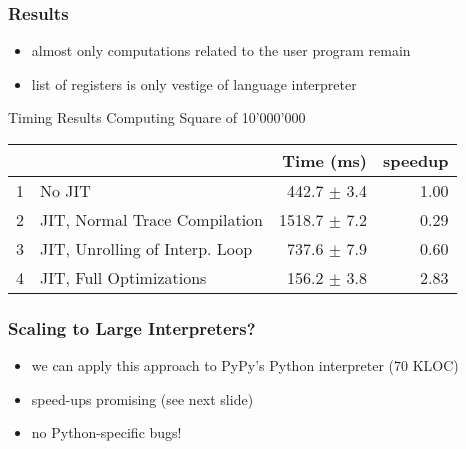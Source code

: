\documentclass[utf8x]{beamer}
\begin{document}

\begin{frame}
    \frametitle{Results}
    \begin{itemize}
    \item almost only computations related to the user program remain
    \item list of registers is only vestige of language interpreter
    \end{itemize}
    \pause
    \begin{block}{Timing Results Computing Square of 10'000'000}
    \begin{tabular}{|l|l|r|r|}
\hline
& &Time (ms) &speedup\\
\hline
1 &No JIT &442.7 $\pm$ 3.4 &1.00\\
2 &JIT, Normal Trace Compilation &1518.7 $\pm$ 7.2 &0.29\\
3 &JIT, Unrolling of Interp. Loop &737.6 $\pm$ 7.9 &0.60\\
4 &JIT, Full Optimizations &156.2 $\pm$ 3.8 &2.83\\
\hline
\end{tabular}
\end{block}
\end{frame}

\begin{frame}
    \frametitle{Scaling to Large Interpreters?}
    \begin{itemize}
    \item we can apply this approach to PyPy's Python interpreter (70 KLOC)
    \item speed-ups promising (see next slide)
    \item no Python-specific bugs!
    \end{itemize}
\end{frame}
\end{document}
